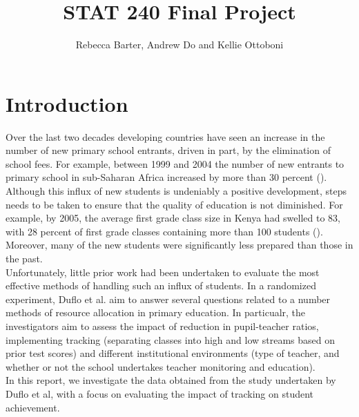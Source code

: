 \documentclass[11pt]{article}
\title{STAT 240 Final Project}
\author{Rebecca Barter, Andrew Do and Kellie Ottoboni}
\begin{document}
\maketitle

 \section{Introduction}
Over the last two decades developing countries have seen an increase in the number of new primary school entrants, driven in part, by the elimination of school fees. For example, between 1999 and 2004 the number of new entrants to primary school in sub-Saharan Africa increased by more than 30 percent (\cite{unesco2007}). Although this influx of new students is undeniably a positive development, steps needs to be taken to ensure that the quality of education is not diminished. For example, by 2005, the average first grade class size in Kenya had swelled to 83, with 28 percent of first grade classes containing more than 100 students (\cite{duflo2007}). Moreover, many of the new students were significantly less prepared than those in the past.\\
Unfortunately, little prior work had been undertaken to evaluate the most effective methods of handling such an influx of students. In a randomized experiment, Duflo et al. aim to answer several questions related to a number methods of resource allocation in primary education. In particualr, the investigators aim to assess the impact of reduction in pupil-teacher ratios, implementing tracking (separating classes into high and low streams based on prior test scores) and different institutional environments (type of teacher, and whether or not the school undertakes teacher monitoring and education).\\
 In this report, we investigate the data obtained from the study undertaken by Duflo et al, with a focus on evaluating the impact of tracking on student achievement. 
 
\end{document}
